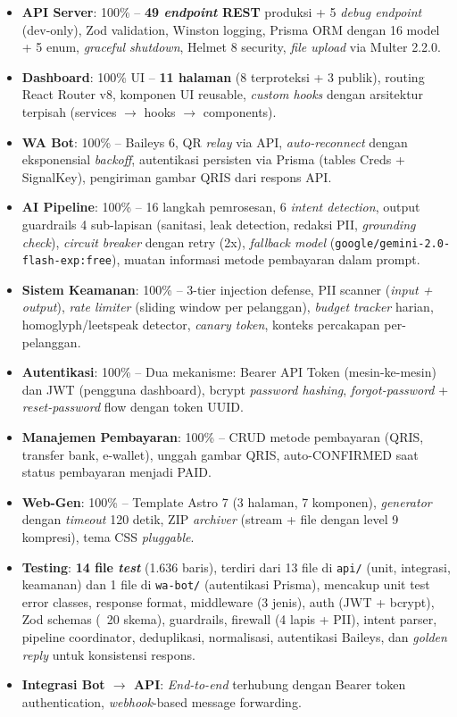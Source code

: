 \documentclass[12pt,a4paper,oneside]{article}
\begin{document}
\begin{itemize}
	\item \textbf{API Server}: 100\% -- \textbf{49 \textit{endpoint} REST} produksi + 5 \textit{debug endpoint} (dev-only), Zod validation, Winston logging, Prisma ORM dengan 16 model + 5 enum, \textit{graceful shutdown}, Helmet 8 security, \textit{file upload} via Multer 2.2.0.
	\item \textbf{Dashboard}: 100\% UI -- \textbf{11 halaman} (8 terproteksi + 3 publik), routing React Router v8, komponen UI reusable, \textit{custom hooks} dengan arsitektur terpisah (services $\rightarrow$ hooks $\rightarrow$ components).
	\item \textbf{WA Bot}: 100\% -- Baileys 6, QR \textit{relay} via API, \textit{auto-reconnect} dengan eksponensial \textit{backoff}, autentikasi persisten via Prisma (tables Creds + SignalKey), pengiriman gambar QRIS dari respons API.
	\item \textbf{AI Pipeline}: 100\% -- 16 langkah pemrosesan, 6 \textit{intent detection}, output guardrails 4 sub-lapisan (sanitasi, leak detection, redaksi PII, \textit{grounding check}), \textit{circuit breaker} dengan retry (2x), \textit{fallback model} (\texttt{google/gemini-2.0-flash-exp:free}), muatan informasi metode pembayaran dalam prompt.
	\item \textbf{Sistem Keamanan}: 100\% -- 3-tier injection defense, PII scanner (\textit{input + output}), \textit{rate limiter} (sliding window per pelanggan), \textit{budget tracker} harian, homoglyph/leetspeak detector, \textit{canary token}, konteks percakapan per-pelanggan.
	\item \textbf{Autentikasi}: 100\% -- Dua mekanisme: Bearer API Token (mesin-ke-mesin) dan JWT (pengguna dashboard), bcrypt \textit{password hashing}, \textit{forgot-password} + \textit{reset-password} flow dengan token UUID.
	\item \textbf{Manajemen Pembayaran}: 100\% -- CRUD metode pembayaran (QRIS, transfer bank, e-wallet), unggah gambar QRIS, auto-CONFIRMED saat status pembayaran menjadi PAID.
	\item \textbf{Web-Gen}: 100\% -- Template Astro 7 (3 halaman, 7 komponen), \textit{generator} dengan \textit{timeout} 120 detik, ZIP \textit{archiver} (stream + file dengan level 9 kompresi), tema CSS \textit{pluggable}.
	\item \textbf{Testing}: \textbf{14 file \textit{test}} (1.636 baris), terdiri dari 13 file di \texttt{api/} (unit, integrasi, keamanan) dan 1 file di \texttt{wa-bot/} (autentikasi Prisma), mencakup unit test error classes, response format, middleware (3 jenis), auth (JWT + bcrypt), Zod schemas (~20 skema), guardrails, firewall (4 lapis + PII), intent parser, pipeline coordinator, deduplikasi, normalisasi, autentikasi Baileys, dan \textit{golden reply} untuk konsistensi respons.
	\item \textbf{Integrasi Bot $\rightarrow$ API}: \textit{End-to-end} terhubung dengan Bearer token authentication, \textit{webhook}-based message forwarding.
\end{itemize}
\end{document}

